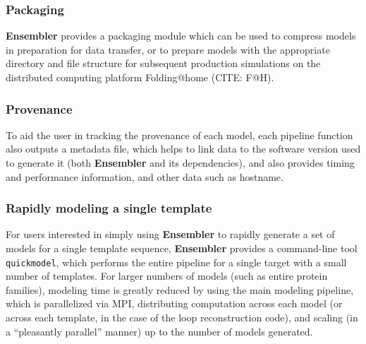 \documentclass[aps,pre,twocolumn,nofootinbib,superscriptaddress,linenumbers]{revtex4-1}
\begin{document}
\subsubsection{Packaging}

{\bf Ensembler} provides a packaging module which can be used to compress models in preparation for data transfer, or to prepare models with the appropriate directory and file structure for subsequent production simulations on the distributed computing platform Folding@home (CITE: F@H).

\subsubsection{Provenance}

To aid the user in tracking the provenance of each model, each pipeline function also outputs a metadata file, which helps to link data to the software version used to generate it (both {\bf Ensembler} and its dependencies), and also provides timing and performance information, and other data such as hostname.

\subsubsection{Rapidly modeling a single template}

For users interested in simply using {\bf Ensembler} to rapidly generate a set of models for a single template sequence, {\bf Ensembler} provides a command-line tool {\tt quickmodel}, which performs the entire pipeline for a single target with a small number of templates.
For larger numbers of models (such as entire protein families), modeling time is greatly reduced by using the main modeling pipeline, which is parallelized via MPI, distributing computation across each model (or across each template, in the case of the loop reconstruction code), and scaling (in a ``pleasantly parallel'' manner) up to the number of models generated.







\end{document}
